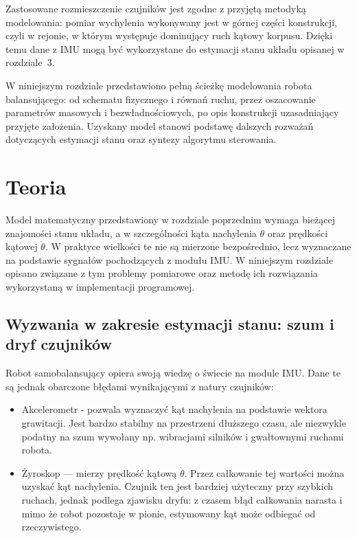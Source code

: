 \documentclass[12pt,twoside]{article}
\begin{document}
Zastosowane rozmieszczenie czujników jest zgodne z przyjętą metodyką modelowania: pomiar wychylenia wykonywany jest w górnej części konstrukcji, czyli w rejonie, w którym występuje dominujący ruch kątowy korpusu. Dzięki temu dane z IMU mogą być wykorzystane do estymacji stanu układu opisanej w rozdziale~3.

W niniejszym rozdziale przedstawiono pełną ścieżkę modelowania robota balansującego: od schematu fizycznego i równań ruchu, przez oszacowanie parametrów masowych i bezwładnościowych, po opis konstrukcji uzasadniający przyjęte założenia. Uzyskany model stanowi podstawę dalszych rozważań dotyczących estymacji stanu oraz syntezy algorytmu sterowania.

\newpage



\section{Teoria}

Model matematyczny przedstawiony w rozdziale poprzednim wymaga bieżącej znajomości stanu układu, a w szczególności kąta nachylenia $\theta$ oraz prędkości kątowej $\dot{\theta}$. W praktyce wielkości te nie są mierzone bezpośrednio, lecz wyznaczane na podstawie sygnałów pochodzących z modułu IMU. W niniejszym rozdziale opisano związane z tym problemy pomiarowe oraz metodę ich rozwiązania wykorzystaną w implementacji programowej.

\subsection{Wyzwania w zakresie estymacji stanu: szum i dryf czujników}
Robot samobalansujący opiera swoją wiedzę o świecie na module IMU. Dane te są jednak obarczone błędami wynikającymi z natury czujników:
\begin{itemize}
    \item Akcelerometr - pozwala wyznaczyć kąt nachylenia na podstawie wektora grawitacji. Jest bardzo stabilny na przestrzeni dłuższego czasu, ale niezwykle podatny na szum wywołany np. wibracjami silników i gwałtownymi ruchami robota.
    \item Żyroskop --- mierzy prędkość kątową $\dot{\theta}$. Przez całkowanie tej wartości można uzyskać kąt nachylenia. Czujnik ten jest bardziej użyteczny przy szybkich ruchach, jednak podlega zjawisku dryfu: z czasem błąd całkowania narasta i mimo że robot pozostaje w pionie, estymowany kąt może odbiegać od rzeczywistego.
\end{itemize}
\end{document}
